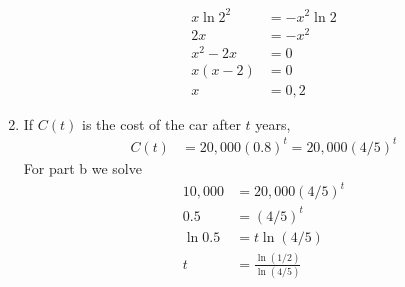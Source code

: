 \begin{enumerate}
\begin{align*}
        x \ln 2^2 &= -x^2 \ln 2 \\        
        2x &= -x^2 \\    
        x^2 -2x &= 0 \\
        x(x-2) &= 0 \\
        x&= 0,2
    \end{align*}
    \item If $C(t)$ is the cost of the car after $t$ years,
    \begin{align*}
    	C(t) &= 20,000(0.8)^t = 20,000(4/5)^t
    \end{align*}
    For part b we solve
    \begin{align*}
    	10,000 &= 20,000(4/5)^t \\
        0.5 &= (4/5)^t \\
        \ln 0.5 &= t \ln (4/5) \\
        t &= \frac{\ln (1/2)}{\ln(4/5)}
    \end{align*}  
\end{enumerate}




